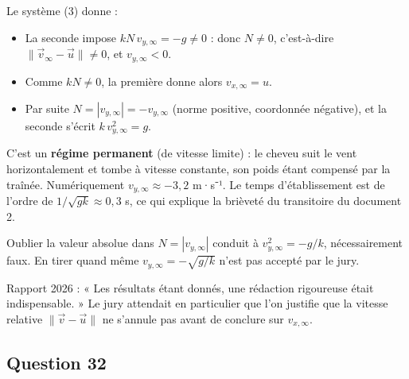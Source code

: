 \documentclass[11pt,a4paper]{article}
\providecommand{\tightlist}{\setlength{\itemsep}{0pt}\setlength{\parskip}{0pt}}
\newcommand{\equationajustee}[1]{%
  \sbox{\boiteequation}{$\displaystyle #1$}%
  \ifdim\wd\boiteequation>\linewidth
    \[\resizebox{\linewidth}{!}{\usebox{\boiteequation}}\]%
  \else
    \[#1\]%
  \fi}
\begin{document}
Le système (3) donne :

\equationajustee{\begin{aligned}
0 &= -kN\,(v_{x,\infty} - u) \\
0 &= -g - kN\,v_{y,\infty}
\end{aligned}}

\begin{itemize}
\tightlist
\item
  La seconde impose \(kN\,v_{y,\infty} = -g \neq 0\) : donc \(N \neq 0\), c'est-à-dire \(\|\vec v_\infty - \vec u\| \neq 0\), et \(v_{y,\infty} < 0\).
\item
  Comme \(kN \neq 0\), la première donne alors \(v_{x,\infty} = u\).
\item
  Par suite \(N = |v_{y,\infty}| = -v_{y,\infty}\) (norme positive, coordonnée négative), et la seconde s'écrit \(k\,v_{y,\infty}^2 = g\).
\end{itemize}

\equationajustee{\boxed{\begin{aligned}
v_{x,\infty} &= u \\
v_{y,\infty} &= -\sqrt{\frac{g}{k}}
\end{aligned}}}

C'est un \textbf{régime permanent} (de vitesse limite) : le cheveu suit le vent horizontalement et tombe à vitesse constante, son poids étant compensé par la traînée. Numériquement \(v_{y,\infty} \approx -3{,}2\) m·s⁻¹. Le temps d'établissement est de l'ordre de \(1/\sqrt{gk} \approx 0{,}3\) s, ce qui explique la brièveté du transitoire du document 2.

\begin{piege}

Oublier la valeur absolue dans \(N = |v_{y,\infty}|\) conduit à \(v_{y,\infty}^2 = -g/k\), nécessairement faux. En tirer quand même \(v_{y,\infty} = -\sqrt{g/k}\) n'est pas accepté par le jury.

\end{piege}

\begin{jury}

Rapport 2026 : « Les résultats étant donnés, une rédaction rigoureuse était indispensable. » Le jury attendait en particulier que l'on justifie que la vitesse relative \(\|\vec v - \vec u\|\) ne s'annule pas avant de conclure sur \(v_{x,\infty}\).

\end{jury}

\hypertarget{question-32}{%
\subsection{Question 32}\label{question-32}}
\end{document}

